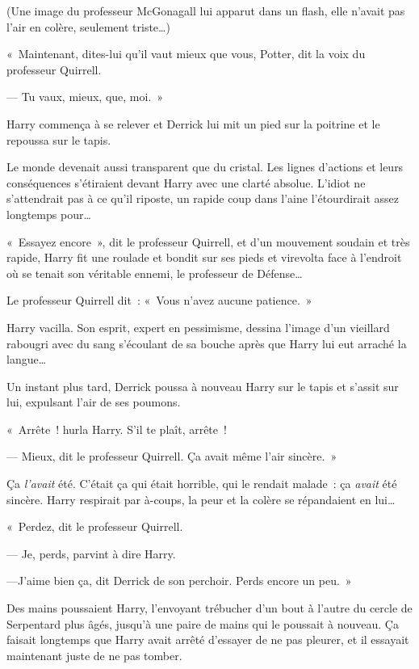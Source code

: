 (Une image du professeur McGonagall lui apparut dans un flash, elle n'avait pas l'air en colère, seulement triste…)

«~Maintenant, dites-lui qu'il vaut mieux que vous, Potter, dit la voix du professeur Quirrell.

--- Tu vaux, mieux, que, moi.~»

Harry commença à se relever et Derrick lui mit un pied sur la poitrine et le repoussa sur le tapis.

Le monde devenait aussi transparent que du cristal. Les lignes d'actions et leurs conséquences s'étiraient devant Harry avec une clarté absolue. L'idiot ne s'attendrait pas à ce qu'il riposte, un rapide coup dans l'aine l'étourdirait assez longtemps pour…

«~Essayez encore~», dit le professeur Quirrell, et d'un mouvement soudain et très rapide, Harry fit une roulade et bondit sur ses pieds et virevolta face à l'endroit où se tenait son véritable ennemi, le professeur de Défense…

Le professeur Quirrell dit~: «~Vous n'avez aucune patience.~»

Harry vacilla. Son esprit, expert en pessimisme, dessina l'image d'un vieillard rabougri avec du sang s'écoulant de sa bouche après que Harry lui eut arraché la langue…

Un instant plus tard, Derrick poussa à nouveau Harry sur le tapis et s'assit sur lui, expulsant l'air de ses poumons.

«~Arrête~! hurla Harry. S'il te plaît, arrête~!

--- Mieux, dit le professeur Quirrell. Ça avait même l'air sincère.~»

Ça \emph{l'avait} été. C'était ça qui était horrible, qui le rendait malade~: ça \emph{avait} été sincère. Harry respirait par à-coups, la peur et la colère se répandaient en lui…

«~Perdez, dit le professeur Quirrell.

--- Je, perds, parvint à dire Harry.

---J'aime bien ça, dit Derrick de son perchoir. Perds encore un peu.~»

\later

Des mains poussaient Harry, l'envoyant trébucher d'un bout à l'autre du cercle de Serpentard plus âgés, jusqu'à une paire de mains qui le poussait à nouveau. Ça faisait longtemps que Harry avait arrêté d'essayer de ne pas pleurer, et il essayait maintenant juste de ne pas tomber.


